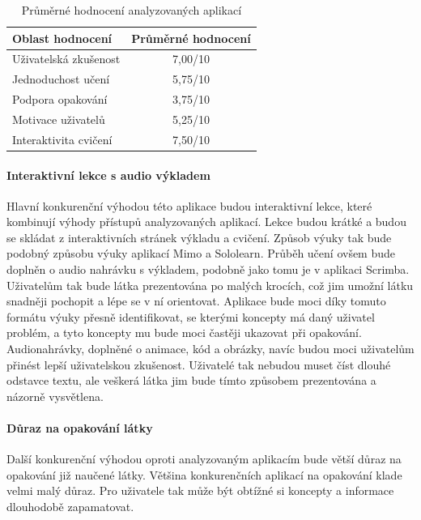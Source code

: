 \begin{table}[ht]
    \centering
    \begin{tabular}{@{} l c @{}}
        \toprule
        Oblast hodnocení & Průměrné hodnocení \\
        \midrule
        Uživatelská zkušenost & 7,00/10 \\
        Jednoduchost učení & 5,75/10 \\
        Podpora opakování & 3,75/10 \\
        Motivace uživatelů & 5,25/10 \\
        Interaktivita cvičení & 7,50/10 \\
        \bottomrule
    \end{tabular}
    \captionsetup{justification=centering}
    \caption{Průměrné hodnocení analyzovaných aplikací}
    \label{table:competitor-rating-averages}
\end{table}

\paragraph{Interaktivní lekce s audio výkladem}

Hlavní konkurenční výhodou této aplikace budou interaktivní lekce, které kombinují výhody přístupů analyzovaných aplikací. Lekce budou krátké a budou se skládat z interaktivních stránek výkladu a cvičení. Způsob výuky tak bude podobný způsobu výuky aplikací Mimo a Sololearn. Průběh učení ovšem bude doplněn o audio nahrávku s výkladem, podobně jako tomu je v aplikaci Scrimba. Uživatelům tak bude látka prezentována po malých krocích, což jim umožní látku snadněji pochopit a lépe se v ní orientovat. Aplikace bude moci díky tomuto formátu výuky přesně identifikovat, se kterými koncepty má daný uživatel problém, a tyto koncepty mu bude moci častěji ukazovat při opakování. Audionahrávky, doplněné o animace, kód a obrázky, navíc budou moci uživatelům přinést lepší uživatelskou zkušenost. Uživatelé tak nebudou muset číst dlouhé odstavce textu, ale veškerá látka jim bude tímto způsobem prezentována a názorně vysvětlena.

\paragraph{Důraz na opakování látky}

Další konkurenční výhodou oproti analyzovaným aplikacím bude větší důraz na opakování již naučené látky. Většina konkurenčních aplikací na opakování klade velmi malý důraz. Pro uživatele tak může být obtížné si koncepty a informace dlouhodobě zapamatovat.

